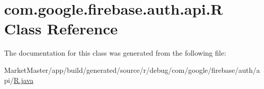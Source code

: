 \hypertarget{classcom_1_1google_1_1firebase_1_1auth_1_1api_1_1R}{}\section{com.\+google.\+firebase.\+auth.\+api.\+R Class Reference}
\label{classcom_1_1google_1_1firebase_1_1auth_1_1api_1_1R}


The documentation for this class was generated from the following file\+:\begin{DoxyCompactItemize}
\item 
Market\+Master/app/build/generated/source/r/debug/com/google/firebase/auth/api/\mbox{\hyperlink{debug_2com_2google_2firebase_2auth_2api_2R_8java}{R.\+java}}\end{DoxyCompactItemize}

